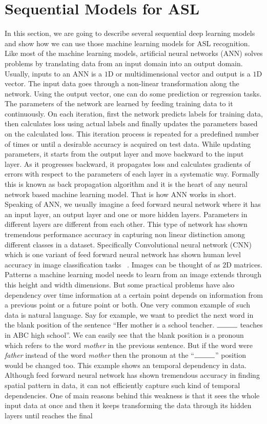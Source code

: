 \documentclass[10pt,twocolumn,letterpaper]{article}
\begin{document}
\section{Sequential Models for ASL}
In this section, we are going to describe several sequential deep learning models and show how we can use those machine learning models for ASL recognition. Like most of the machine learning models, artificial neural networks (ANN) solves problems by translating data from an input domain into an output domain. Usually, inputs to an ANN is a $1$D or multidimensional vector and output is a $1$D vector. The input data goes through a non-linear transformation along the network. Using the output vector, one can do some prediction or regression tasks. The parameters of the network are learned by feeding training data to it continuously. On each iteration, first the network predicts labels for training data, then calculates loss using actual labels and finally updates the parameters based on the calculated loss. This iteration process is repeated for a predefined number of times or until a desirable accuracy is acquired on test data. While updating parameters, it starts from the output layer and move backward to the input layer. As it progresses backward, it propagates loss and calculates gradients of errors with respect to the parameters of each layer in a systematic way. Formally this is known as back propagation algorithm and it is the heart of any neural network based machine learning model. That is how ANN works in short. Speaking of ANN, we usually imagine a feed forward neural network where it has an input layer, an output layer and one or more hidden layers. Parameters in different layers are different from each other. This type of network has shown tremendous performance accuracy in capturing non linear distinction among different classes in a dataset. Specifically Convolutional neural network (CNN) which is one variant of feed forward neural network has shown human level accuracy in image classification tasks ~\cite{NIPS2012_4824}. Images can be thought of as $2$D matrices. Patterns a machine learning model needs to learn from an image extends through this height and width dimensions. But some practical problems have also dependency over time \ie information at a certain point depends on information from a previous point or a future point or both. One very common example of such data is natural language. Say for example, we want to predict the next word in the blank position of the sentence ``Her mother is a school teacher. $\rule{1cm}{0.15mm}$ teaches in ABC high school''. We can easily see that the blank position is a pronoun which refers to the word \emph{mother} in the previous sentence. But if the word were \emph{father} instead of the word \emph{mother} then the pronoun at the ``$\rule{1cm}{0.15mm}$'' position would be changed too. This example shows an temporal dependency in data. Although feed forward neural network has shown tremendous accuracy in finding spatial pattern in data, it can not efficiently capture such kind of temporal dependencies. One of main reasons behind this weakness is that it sees the whole input data at once and then it keeps transforming the data through its hidden layers until reaches the final 
\end{document}
